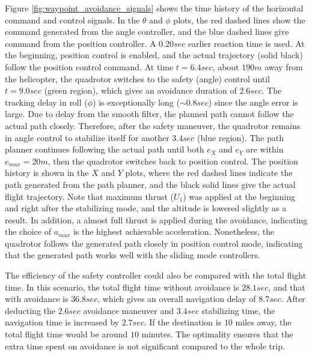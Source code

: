 \documentclass[journal,11pt,onecolumn,draftclsnofoot,]{IEEEtran}
\begin{document}
Figure \ref{fig:waypoint_avoidance_signals} shows the time history of the horizontal command and control signals. In the $\theta$ and $\phi$ plots, the red dashed lines show the command generated from the angle controller, and the blue dashed lines give command from the position controller. A $0.20sec$ earlier reaction time is used. At the beginning, position control is enabled, and the actual trajectory (solid black) follow the position control command. At time $t=6.4sec$, about $190 m$ away from the helicopter, the quadrotor switches to the safety (angle) control until $t=9.0sec$ (green region), which gives an avoidance duration of $2.6sec$. The tracking delay in roll ($\phi$) is exceptionally long ($\sim 0.8sec$) since the angle error is large. Due to delay from the smooth filter, the planned path cannot follow the actual path closely. Therefore, after the safety maneuver, the quadrotor remains in angle control to stabilize itself for another $3.4sec$ (blue region). The path planner continues following the actual path until both $e_X$ and $e_Y$ are within $e_{max}=20m$, then the quadrotor switches back to position control. The position history is shown in the $X$ and $Y$ plots, where the red dashed lines indicate the path generated from the path planner, and the black solid lines give the actual flight trajectory. Note that maximum thrust ($U_1$) was applied at the beginning and right after the stabilizing mode, and the altitude is lowered slightly as a result. In addition, a almost full thrust is applied during the avoidance, indicating the choice of $a_{max}$ is the highest achievable acceleration. Nonetheless, the quadrotor follows the generated path closely in position control mode, indicating that the generated path works well with the sliding mode controllers.

The efficiency of the safety controller could also be compared with the total flight time. In this scenario, the total flight time without avoidance is $28.1 sec$, and that with avoidance is $36.8 sec$, which gives an overall navigation delay of $8.7 sec$. After deducting the $2.6 sec$ avoidance maneuver and $3.4 sec$ stabilizing time, the navigation time is increased by $2.7 sec$. If the destination is $10$ miles away, the total flight time would be around $10$ minutes. The optimality ensures that the extra time spent on avoidance is not significant compared to the whole trip.
\end{document}
